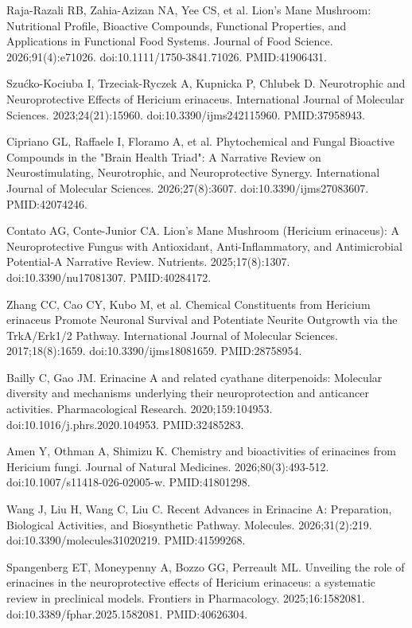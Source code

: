 \documentclass[12pt,oneside]{book}
\newcommand{\reff}[2]{\par\hangindent=7mm\hangafter=1\noindent[#1]\hspace{2mm}#2\par}
\begin{document}
\reff{3}{Raja-Razali RB, Zahia-Azizan NA, Yee CS, et al. Lion's Mane Mushroom: Nutritional Profile, Bioactive Compounds, Functional Properties, and Applications in Functional Food Systems. Journal of Food Science. 2026;91(4):e71026. doi:10.1111/1750-3841.71026. PMID:41906431.}

\reff{4}{Szućko-Kociuba I, Trzeciak-Ryczek A, Kupnicka P, Chlubek D. Neurotrophic and Neuroprotective Effects of Hericium erinaceus. International Journal of Molecular Sciences. 2023;24(21):15960. doi:10.3390/ijms242115960. PMID:37958943.}

\reff{5}{Cipriano GL, Raffaele I, Floramo A, et al. Phytochemical and Fungal Bioactive Compounds in the "Brain Health Triad": A Narrative Review on Neurostimulating, Neurotrophic, and Neuroprotective Synergy. International Journal of Molecular Sciences. 2026;27(8):3607. doi:10.3390/ijms27083607. PMID:42074246.}

\reff{6}{Contato AG, Conte-Junior CA. Lion's Mane Mushroom (Hericium erinaceus): A Neuroprotective Fungus with Antioxidant, Anti-Inflammatory, and Antimicrobial Potential-A Narrative Review. Nutrients. 2025;17(8):1307. doi:10.3390/nu17081307. PMID:40284172.}

\reff{7}{Zhang CC, Cao CY, Kubo M, et al. Chemical Constituents from Hericium erinaceus Promote Neuronal Survival and Potentiate Neurite Outgrowth via the TrkA/Erk1/2 Pathway. International Journal of Molecular Sciences. 2017;18(8):1659. doi:10.3390/ijms18081659. PMID:28758954.}

\reff{8}{Bailly C, Gao JM. Erinacine A and related cyathane diterpenoids: Molecular diversity and mechanisms underlying their neuroprotection and anticancer activities. Pharmacological Research. 2020;159:104953. doi:10.1016/j.phrs.2020.104953. PMID:32485283.}

\reff{9}{Amen Y, Othman A, Shimizu K. Chemistry and bioactivities of erinacines from Hericium fungi. Journal of Natural Medicines. 2026;80(3):493-512. doi:10.1007/s11418-026-02005-w. PMID:41801298.}

\reff{10}{Wang J, Liu H, Wang C, Liu C. Recent Advances in Erinacine A: Preparation, Biological Activities, and Biosynthetic Pathway. Molecules. 2026;31(2):219. doi:10.3390/molecules31020219. PMID:41599268.}

\reff{11}{Spangenberg ET, Moneypenny A, Bozzo GG, Perreault ML. Unveiling the role of erinacines in the neuroprotective effects of Hericium erinaceus: a systematic review in preclinical models. Frontiers in Pharmacology. 2025;16:1582081. doi:10.3389/fphar.2025.1582081. PMID:40626304.}
\end{document}
